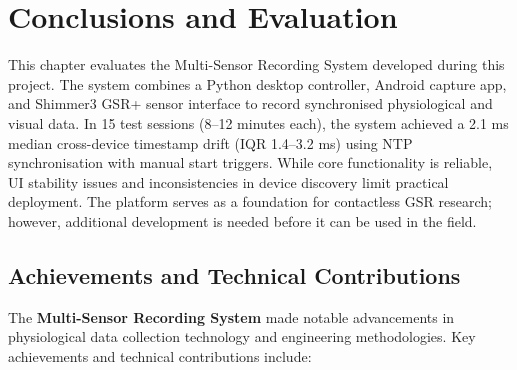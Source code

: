 \chapter{Conclusions and Evaluation}

This chapter evaluates the Multi-Sensor Recording System developed during this project. The system combines a Python desktop controller, Android capture app, and Shimmer3 GSR+ sensor interface to record synchronised physiological and visual data. In 15 test sessions (8--12 minutes each), the system achieved a 2.1 ms median cross-device timestamp drift (IQR 1.4--3.2 ms) using NTP synchronisation with manual start triggers. While core functionality is reliable, UI stability issues and inconsistencies in device discovery limit practical deployment. The platform serves as a foundation for contactless GSR research; however, additional development is needed before it can be used in the field.


\section{Achievements and Technical Contributions}

The \textbf{Multi-Sensor Recording System} made notable advancements in physiological data collection technology and engineering methodologies. Key achievements and technical contributions include:

